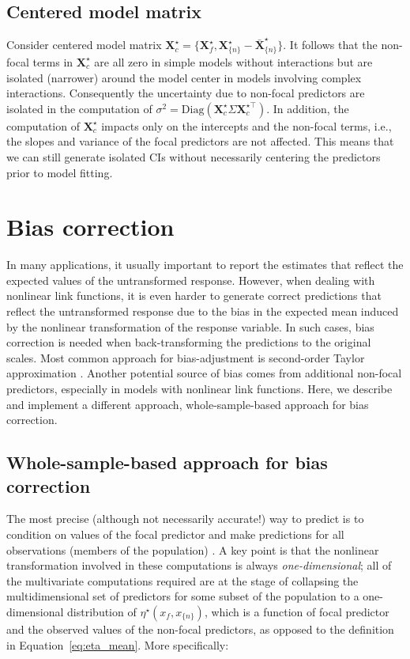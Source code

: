 \documentclass[10pt,letterpaper]{article}
\newcommand{\bX}{{\mathbf X}}
\newcommand{\nset}[1]{#1_{\{n\}}}
\begin{document}
\subsection*{Centered model matrix}

Consider centered model matrix $\bX^{\star}_{c} = \{\bX_f^\star, \nset{{\bX}^\star} - \nset{{\bar{\bX}}^\star}\}$. It follows that the non-focal terms in $\bX^{\star}_{c}$ are all zero in simple models without interactions but are isolated (narrower) around the model center in models involving complex interactions. Consequently the uncertainty due to non-focal predictors are isolated in the computation of $\sigma^2 = \textrm{Diag}(\bX^\star_c \Sigma \bX^{\star\top}_c)$. In addition, the computation of $\bX^{\star}_c$ impacts only on the intercepts and the non-focal terms, i.e., the slopes and variance of the focal predictors are not affected. This means that we can still generate isolated CIs without necessarily centering the predictors prior to model fitting.


\section*{Bias correction}

In many applications, it usually important to report the estimates that reflect the expected values of the untransformed response. However, when dealing with nonlinear link functions, it is even harder to generate correct predictions that reflect the untransformed response due to the bias in the expected mean induced by the nonlinear transformation of the response variable. In such cases, bias correction is needed when back-transforming the predictions to the original scales. Most common approach for bias-adjustment is second-order Taylor approximation \cite{lenth2018package, duursma2003bias}. Another potential source of bias comes from additional non-focal predictors, especially in models with nonlinear link functions. Here, we describe and implement a different approach, whole-sample-based approach for bias correction.


\subsection*{Whole-sample-based approach for bias correction}

The most precise (although not necessarily accurate!) way to predict is to condition on values of the focal predictor and make predictions for all observations (members of the population) \cite{hanmer2013behind}. A key point is that the nonlinear transformation involved in these computations is always \emph{one-dimensional}; all of the multivariate computations required are at the stage of collapsing the multidimensional set of predictors for some subset of the population to a one-dimensional distribution of $\eta^\star(x_f, \nset{x})$, which is a function of focal predictor and the observed values of the non-focal predictors, as opposed to the definition in Equation~\ref{eq:eta_mean}. More specifically:
\end{document}
